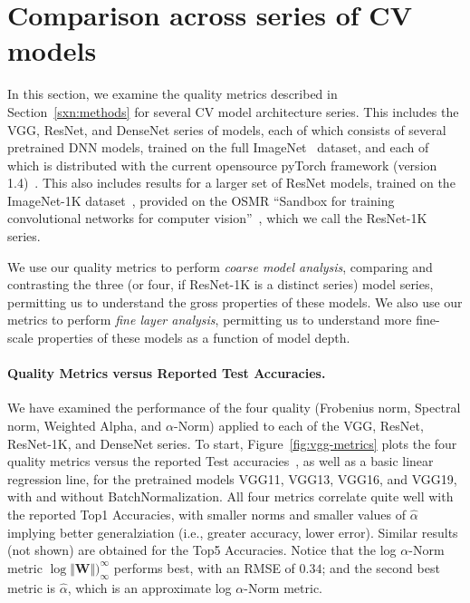 \section{Comparison across series of CV models}
\label{sxn:cv}





In this section, we examine the quality metrics described in Section~\ref{sxn:methods} for several CV model architecture series.
This includes the VGG, ResNet, and DenseNet series of models, each of which consists of several pretrained DNN models, trained on the full ImageNet~\cite{imagenet} dataset, and each of which is distributed with the current opensource pyTorch framework (version 1.4)~\cite{pyTorch}.
This also includes results for a larger set of ResNet models, trained on the ImageNet-1K dataset~\cite{imagenet1k}, provided on the OSMR ``Sandbox for training convolutional networks for computer vision''~\cite{osmr}, which we call the ResNet-1K series.

We use our quality metrics to perform \emph{coarse model analysis}, comparing and contrasting the three (or four, if ResNet-1K is a distinct series) model series, permitting us to understand the gross properties of these models. 
We also use our metrics to perform \emph{fine layer analysis}, permitting us to understand more fine-scale properties of these models as a function of model depth.


\paragraph{Quality Metrics versus Reported Test Accuracies.}

We have examined the performance of the four quality (Frobenius norm, Spectral norm, Weighted Alpha, and $\alpha$-Norm) applied to each of the VGG, ResNet, ResNet-1K, and DenseNet series.
To start, Figure~\ref{fig:vgg-metrics} plots the four quality metrics versus the reported Test accuracies~\cite{pyTorchVgg}, as well as a basic linear regression line, 
for the pretrained models VGG11, VGG13, VGG16, and VGG19, with and without BatchNormalization.
All four metrics correlate quite well with the reported Top1 Accuracies, with smaller norms and smaller values of $\hat{\alpha}$ implying better generalziation (i.e., greater accuracy, lower error). 
Similar results (not shown) are obtained for the Top5 Accuracies.  
Notice that the log $\alpha$-Norm metric $\log\Vert\mathbf{W}\Vert)_{\infty}^{\infty}$ 
performs best, with an RMSE of $0.34$; and the second best metric is $\hat\alpha$, which is an approximate log $\alpha$-Norm metric.


